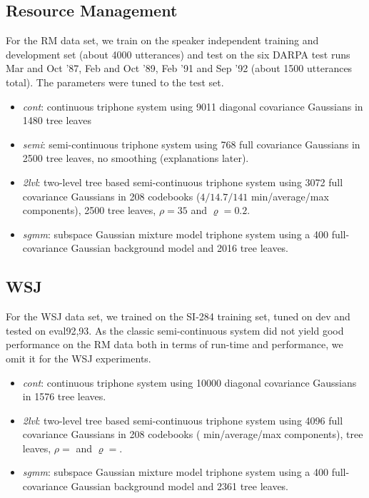 \documentclass{article}
\begin{document}
\subsection{Resource Management}
For the RM data set, we train on the speaker independent training and development 
set (about 4000 utterances) and test on the six DARPA test runs Mar and Oct '87,
Feb and Oct '89, Feb '91 and Sep '92 (about 1500 utterances total).  The parameters 
were tuned to the test set.
%
\begin{itemize}
\item
  {\em cont}: continuous triphone system using 9011 diagonal covariance
  Gaussians in 1480 tree leaves
\item
  {\em semi}: semi-continuous triphone system using 768 full covariance
  Gaussians in 2500 tree leaves, no smoothing (explanations later).
\item
  {\em 2lvl}: two-level tree based semi-continuous triphone system using
  3072 full covariance Gaussians in 208 codebooks ($4/14.7/141$ min/average/max
  components), 2500 tree leaves, $\rho = 35$ and $\varrho = 0.2$.
\item
  {\em sgmm}: subspace Gaussian mixture model triphone system using a 400 
  full-covariance Gaussian background model and 2016 tree leaves.
\end{itemize}

\subsection{WSJ}
For the WSJ data set, we trained on the SI-284 training set, tuned on dev
and tested on eval92,93.
As the classic semi-continuous system did not yield good performance on the
RM data both in terms of run-time and performance, we omit it for the WSJ
experiments.
%
\begin{itemize}
\item
  {\em cont}: continuous triphone system using 10000 diagonal covariance
  Gaussians in 1576 tree leaves.
\item
  {\em 2lvl}: two-level tree based semi-continuous triphone system using
  4096 full covariance Gaussians in 208 codebooks ( min/average/max
  components),  tree leaves, $\rho = $ and $\varrho = $.
\item
  {\em sgmm}: subspace Gaussian mixture model triphone system using a 400 
  full-covariance Gaussian background model and 2361 tree leaves.
\end{itemize}
\end{document}
